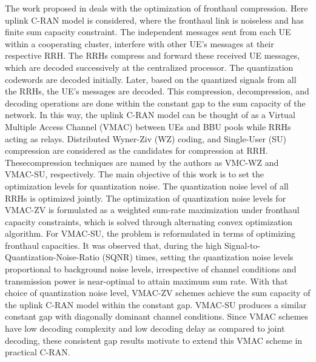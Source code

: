 \begin{multicols}{2}
\begin{itemize}
The work proposed in \cite{art3-key53} deals with the optimization of fronthaul compression. Here uplink C-RAN model is considered, where the fronthaul link is noiseless and has finite sum capacity constraint. The independent messages sent from each UE within a cooperating cluster, interfere with other UE’s messages at their respective RRH. The RRHs compress and forward these received UE messages, which are decoded successively at the centralized processor. The quantization codewords are decoded initially. Later, based on the quantized signals from all the RRHs, the UE’s messages are decoded. This compression, decompression, and decoding operations are done within the constant gap to the sum capacity of the network. In this way, the uplink C-RAN model can be thought of as a Virtual Multiple Access Channel (VMAC) between UEs and BBU pools while RRHs acting as relays. Distributed Wyner-Ziv (WZ) coding, and Single-User (SU) compression are considered as the candidates for compression at RRH. These\break compression techniques are named by the authors as VMC-WZ and VMAC-SU, respectively. The main objective of this work is to set the optimization levels for quantization noise. The quantization noise level of all RRHs is optimized jointly. The optimization of quantization noise levels for VMAC-ZV is formulated as a weighted sum-rate maximization under fronthaul capacity constraints, which is solved through alternating convex optimization algorithm. For VMAC-SU, the problem is reformulated in terms of optimizing fronthaul capacities. It was observed that, during the high Signal-to-Quantization-Noise-Ratio (SQNR) times, setting the quantization noise levels proportional to background noise levels, irrespective of channel conditions and transmission power is near-optimal to attain maximum sum rate. With that choice of quantization noise level, VMAC-ZV schemes achieve the sum capacity of the uplink C-RAN model within the constant gap. VMAC-SU produces a similar constant gap with diagonally dominant channel conditions. Since VMAC schemes have low decoding complexity and low decoding delay as compared to joint decoding, these consistent gap results motivate to extend this VMAC scheme in practical \break C-RAN.


\end{itemize}
\end{multicols}
